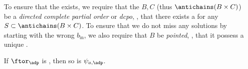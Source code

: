 



To ensure that the  exists, we require that the  $B, C$ (thus $\antichains (B \times C)$) be a \emph{directed complete partial order} or \emph{dcpo}, \ie,  that there exists a  for any  $S \subset \antichains (B \times C)$.
To ensure that we do not miss any solutions by starting with the wrong $b_{\text{in}}$, we also require that $B$ be \emph{pointed}, \ie,  that it possess a unique .


\begin{lemma}
    If $\ftor_\adp$ is , then so is $\psi_{a,\adp}$.
\end{lemma}

